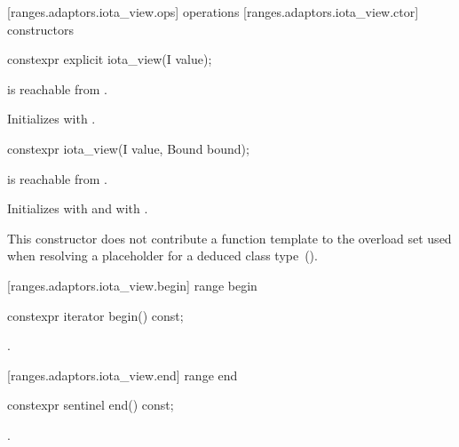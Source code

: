 [ranges.adaptors.iota_view.ops]{ operations}
[ranges.adaptors.iota_view.ctor]{ constructors}

%
\begin{itemdecl}
constexpr explicit iota_view(I value);
\end{itemdecl}

\begin{itemdescr}
\pnum
\requires {} is reachable from .

\pnum
\effects Initializes  with .
\end{itemdescr}

%
\begin{itemdecl}
constexpr iota_view(I value, Bound bound);
\end{itemdecl}

\begin{itemdescr}
\pnum
\requires {} is reachable from .

\pnum
\effects Initializes  with  and  with
.

\pnum
\remarks This constructor does not contribute a function template to the overload
set used when resolving a placeholder for a deduced class
type~().
\end{itemdescr}

[ranges.adaptors.iota_view.begin]{ range begin}

%
\begin{itemdecl}
constexpr iterator begin() const;
\end{itemdecl}

\begin{itemdescr}
\pnum
\returns {}.
\end{itemdescr}

[ranges.adaptors.iota_view.end]{ range end}

%
\begin{itemdecl}
constexpr sentinel end() const;
\end{itemdecl}

\begin{itemdescr}
\pnum
\returns {}.
\end{itemdescr}

